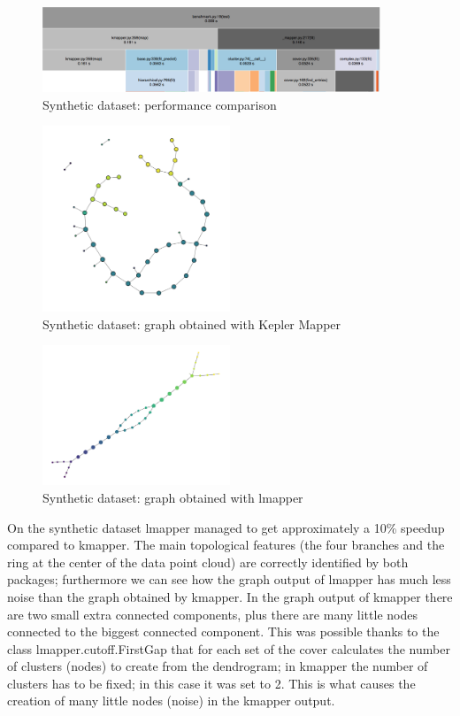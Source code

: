 \begin{figure}[h]
	\caption{Synthetic dataset: performance comparison}
	\centering
	\includegraphics[width=0.9\textwidth]{images/benchmark/synthetic/benchmark}
\end{figure}
\begin{figure}[h]
	\caption{Synthetic dataset: graph obtained with Kepler Mapper}
	\centering
	\includegraphics[width=0.5\textwidth]{images/benchmark/synthetic/benchmark_kmapper}
\end{figure}
\begin{figure}[h]
	\caption{Synthetic dataset: graph obtained with lmapper}
	\centering
	\includegraphics[width=0.5\textwidth]{images/benchmark/synthetic/benchmark_lmapper}
\end{figure}

On the synthetic dataset lmapper managed to get approximately a 10\% speedup compared to kmapper. The main topological features (the four branches and the ring at the center of the data point cloud) are correctly identified by both packages; furthermore we can see how the graph output of lmapper has much less noise than the graph obtained by kmapper. In the graph output of kmapper there are two small extra connected components, plus there are many little nodes connected to the biggest connected component. This was possible thanks to the class lmapper.cutoff.FirstGap that for each set of the cover calculates the number of clusters (nodes) to create from the dendrogram; in kmapper the number of clusters has to be fixed; in this case it was set to 2. This is what causes the creation of many little nodes (noise) in the kmapper output.

